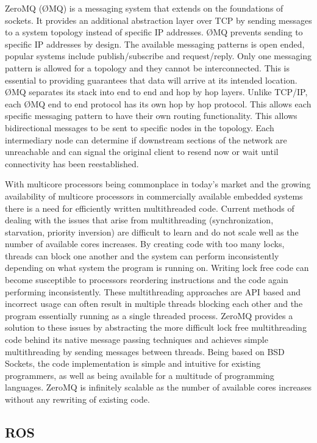 ZeroMQ (ØMQ) is a messaging system that extends on the foundations of sockets. It provides an additional abstraction layer over TCP by sending messages to a system topology instead of specific IP addresses. ØMQ prevents sending to specific IP addresses by design. The available messaging patterns is open ended, popular systems include publish/subscribe and request/reply. Only one messaging pattern is allowed for a topology and they cannot be interconnected. This is essential to providing guarantees that data will arrive at its intended location. ØMQ separates its stack into end to end and hop by hop layers. Unlike TCP/IP, each ØMQ end to end protocol has its own hop by hop protocol\cite{ZMQTHEORY}. This allows each specific messaging pattern to have their own routing functionality. This allows bidirectional messages to be sent to specific nodes in the topology. Each intermediary node can determine if downstream sections of the network are unreachable and can signal the original client to resend now or wait until connectivity has been reestablished. 

With multicore processors being commonplace in today’s market and the growing availability of multicore processors in commercially available embedded systems there is a need for efficiently written multithreaded code. Current methods of dealing with the issues that arise from multithreading (synchronization, starvation, priority inversion) are difficult to learn and do not scale well as the number of available cores increases. By creating code with too many locks, threads can block one another and the system can perform inconsistently depending on what system the program is running on. Writing lock free code can become susceptible to processors reordering instructions and the code again performing inconsistently. These multithreading approaches are API based and incorrect usage can often result in multiple threads blocking each other and the program essentially running as a single threaded process. 
ZeroMQ provides a solution to these issues by abstracting the more difficult lock free multithreading code behind its native message passing techniques and achieves simple multithreading by sending messages between threads. Being based on BSD Sockets, the code implementation is simple and intuitive for existing programmers, as well as being available for a multitude of programming languages. ZeroMQ is infinitely scalable as the number of available cores increases without any rewriting of existing code.


\subsection{ROS}

